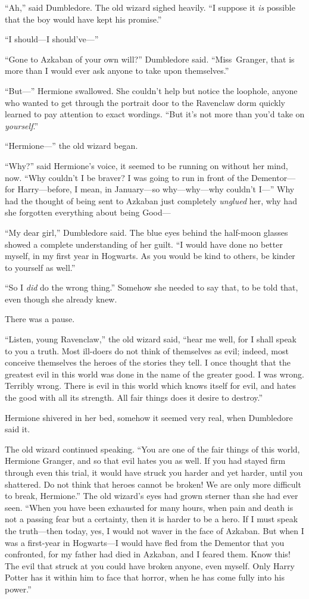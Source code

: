 “Ah,” said Dumbledore. The old wizard sighed heavily. “I suppose it \emph{is} possible that the boy would have kept his promise.”

“I should—I should’ve—”

“Gone to Azkaban of your own will?” Dumbledore said. “Miss~Granger, that is more than I would ever ask anyone to take upon themselves.”

“But—” Hermione swallowed. She couldn’t help but notice the loophole, anyone who wanted to get through the portrait door to the Ravenclaw dorm quickly learned to pay attention to exact wordings. “But it’s not more than you’d take on \emph{yourself}.”

“Hermione—” the old wizard began.

“Why?” said Hermione’s voice, it seemed to be running on without her mind, now. “Why couldn’t I be braver? I was going to run in front of the Dementor—for Harry—before, I mean, in January—so why—why—why couldn’t I—” Why had the thought of being sent to Azkaban just completely \emph{unglued} her, why had she forgotten everything about being Good—

“My dear girl,” Dumbledore said. The blue eyes behind the half-moon glasses showed a complete understanding of her guilt. “I would have done no better myself, in my first year in Hogwarts. As you would be kind to others, be kinder to yourself as well.”

“So I \emph{did} do the wrong thing.” Somehow she needed to say that, to be told that, even though she already knew.

There was a pause.

“Listen, young Ravenclaw,” the old wizard said, “hear me well, for I shall speak to you a truth. Most ill-doers do not think of themselves as evil; indeed, most conceive themselves the heroes of the stories they tell. I once thought that the greatest evil in this world was done in the name of the greater good. I was wrong. Terribly wrong. There is evil in this world which knows itself for evil, and hates the good with all its strength. All fair things does it desire to destroy.”

Hermione shivered in her bed, somehow it seemed very real, when Dumbledore said it.

The old wizard continued speaking. “You are one of the fair things of this world, Hermione Granger, and so that evil hates you as well. If you had stayed firm through even this trial, it would have struck you harder and yet harder, until you shattered. Do not think that heroes cannot be broken! We are only more difficult to break, Hermione.” The old wizard’s eyes had grown sterner than she had ever seen. “When you have been exhausted for many hours, when pain and death is not a passing fear but a certainty, then it is harder to be a hero. If I must speak the truth—then today, yes, I would not waver in the face of Azkaban. But when I was a first-year in Hogwarts—I would have fled from the Dementor that you confronted, for my father had died in Azkaban, and I feared them. Know this! The evil that struck at you could have broken anyone, even myself. Only Harry Potter has it within him to face that horror, when he has come fully into his power.”

